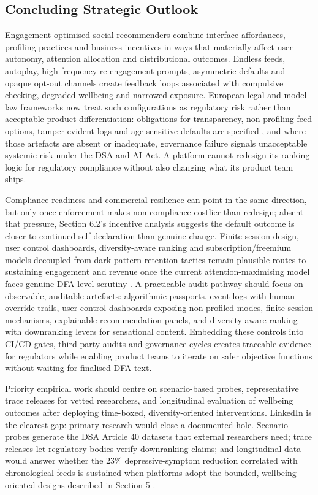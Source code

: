 \documentclass[11pt]{article}
\begin{document}
\subsection{Concluding Strategic Outlook}
\label{sec:concluding_strategic_outlook} Engagement-optimised social recommenders combine interface affordances, profiling practices and business incentives in ways that materially affect user autonomy, attention allocation and distributional outcomes. Endless feeds, autoplay, high-frequency re-engagement prompts, asymmetric defaults and opaque opt-out channels create feedback loops \parencites[2]{3303310}[2]{8958037} associated with compulsive checking, degraded wellbeing and narrowed exposure. European legal and model-law frameworks now treat such configurations as regulatory risk rather than acceptable product differentiation: obligations for transparency, non-profiling feed options, tamper-evident logs and age-sensitive defaults are specified \parencites[12]{6502223}[61--62]{2977039}, and where those artefacts are absent or inadequate, governance failure signals unacceptable systemic risk under the DSA and AI Act. A platform cannot redesign its ranking logic for regulatory compliance without also changing what its product team ships.

Compliance readiness and commercial resilience can point in the same direction, but only once enforcement makes non-compliance costlier than redesign; absent that pressure, Section 6.2's incentive analysis suggests the default outcome is closer to continued self-declaration than genuine change. Finite-session design, user control dashboards, diversity-aware ranking and subscription/freemium models decoupled from dark-pattern retention tactics remain plausible routes to sustaining engagement and revenue once the current attention-maximising model faces genuine DFA-level scrutiny \parencites[390]{7896734}. A practicable audit pathway should focus on observable, auditable artefacts: algorithmic passports, event logs with human-override trails, user control dashboards exposing non-profiled modes, finite session mechanisms, explainable recommendation panels, and diversity-aware ranking with downranking levers for sensational content. Embedding these controls \parencites[16]{6502223}[244]{2977039} into CI/CD gates, third-party audits and governance cycles creates traceable evidence for regulators while enabling product teams to iterate on safer objective functions without waiting for finalised DFA text.

Priority empirical work should centre on scenario-based probes, representative trace releases for vetted researchers, and longitudinal evaluation of wellbeing outcomes after deploying time-boxed, diversity-oriented interventions. LinkedIn is the clearest gap: primary research would close a documented hole. Scenario probes generate the DSA Article 40 datasets that external researchers need; trace releases let regulatory bodies verify downranking claims; and longitudinal data would answer whether the $23\%$ depressive-symptom reduction correlated with chronological feeds is sustained when platforms adopt the bounded, wellbeing-oriented designs described in Section 5 \parencites[119]{2977039}[390]{7896734}.
\end{document}
